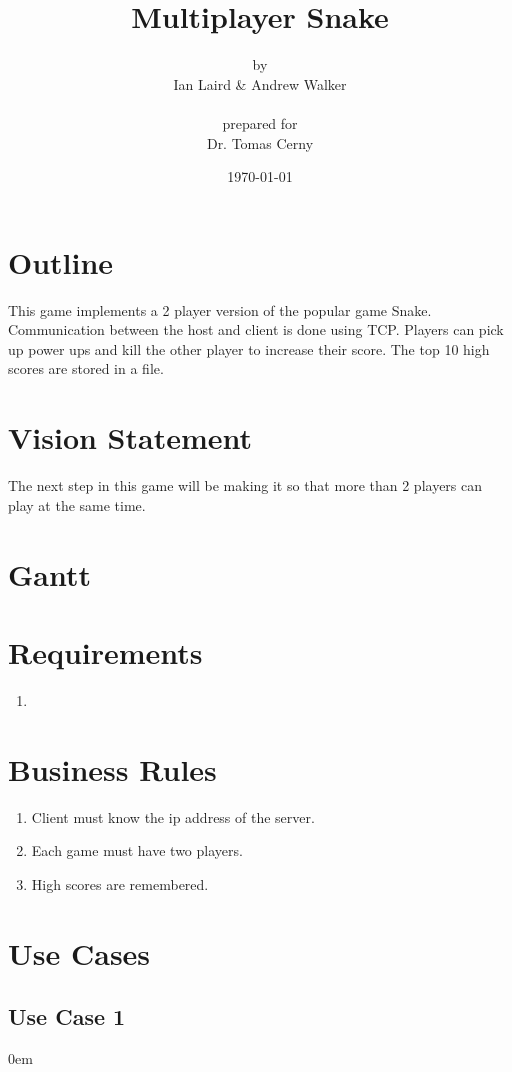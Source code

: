 \documentclass[titlepage]{article}
\title{{\Huge Multiplayer Snake}\\\vspace{3mm}{\large Software Engineering 1 \& Intro to Java}}
\date{\today}
\author{{\normalsize by}\\{\large Ian Laird \& Andrew Walker}\\ \\ {\normalsize prepared for}\\Dr. Tomas Cerny}
\begin{document}
	\maketitle
	\section{Outline}
	This game implements a 2 player version of the popular game Snake. Communication between the host and client is done using TCP. Players can pick up power ups and kill the other player to increase their score. The top 10 high scores are stored in a file.
	
	\section{Vision Statement}
	The next step in this game will be making it so that more than 2 players can play at the same time.
	
	\section{Gantt}
	
	\section{Requirements}
	\begin{enumerate}
		\item 
	\end{enumerate}
	
	\section{Business Rules}
	
	\begin{enumerate}
		\item Client must know the ip address of the server.
		\item Each game must have two players.
		\item High scores are remembered.
	\end{enumerate}
	
	\section{Use Cases}
	\subsection{Use Case 1}
	\itemsep0em 
\end{document}
